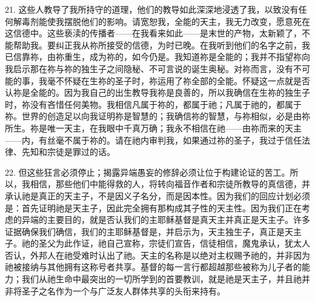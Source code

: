 21. 这些人教导了我所持守的道理，他们的教导如此深深地浸透了我，以致没有任何解毒剂能使我摆脱他们的影响。请宽恕我，全能的天主，我无力改变，愿意死在这信德中。这些亵渎的传播者——在我看来如此——是末世的产物，太新颖了，不能帮助我。要纠正我从祢所接受的信德，为时已晚。在我听到他们的名字之前，我已信靠祢，由祢重生，成为祢的，如今仍是。我知道祢是全能的；我并不指望祢向我启示那在祢与祢的独生子之间隐秘、不可言说的诞生奥秘。对祢而言，没有不可能的事，我毫不怀疑在生祢的圣子时，祢运用了祢全部的全能。怀疑这一点就是否认祢是全能的。因为我自己的出生教导我祢是良善的，所以我确信在生祢的独生子时，祢没有吝惜任何美物。我相信凡属于祢的，都属于祂；凡属于祂的，都属于祢。世界的创造足以向我证明祢是智慧的；我确信祢的智慧，与祢相似，必是由祢所生。祢是唯一天主，在我眼中千真万确；我永不相信在祂——由祢而来的天主——内，有丝毫不属于祢的。请在祂内审判我，如果通过祢的圣子，我过于信任法律、先知和宗徒是罪过的话。\par

22. 但这些狂言必须停止；揭露异端愚妄的修辞必须让位于构建论证的苦工。所以，我相信，那些他们中能得救的人，将转向福音作者和宗徒所教导的真信德，并承认祂是真正的天主子，不是因义子名分，而是因本性。因为我们的回应计划必须是：首先证明祂是天主子，因此完全拥有那构成其子性的天主性。因为我们正在考虑的异端的主要目的，就是否认我们的主耶稣基督是真天主并真正是天主子。许多证据确保我们确信，我们的主耶稣基督是，并启示为，天主独生子，真正是天主子。祂的圣父为此作证，祂自己宣称，宗徒们宣告，信徒相信，魔鬼承认，犹太人否认，外邦人在祂受难时认出了祂。天主的名称是以绝对主权赐予祂的，并非因为祂被接纳与其他拥有这称号者共享。基督的每一言行都超越那些被称为儿子者的能力；我们从祂生命中最突出的一切所学到的首要教训，就是祂是天主子，并且祂并非将圣子之名作为一个与广泛友人群体共享的头衔来持有。\par

